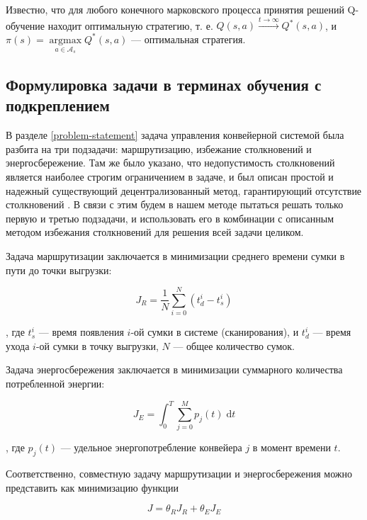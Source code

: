 \documentclass[specification,annotation,times]{itmo-student-thesis}
\DeclareMathOperator{\argmax}{argmax}
\theoremstyle{definition}
\begin{document}
Известно, что для любого конечного марковского процесса принятия решений
Q-обучение находит оптимальную стратегию, т. е. $Q(s, a) \xrightarrow{t
  \rightarrow \infty} Q^*(s, a)$, и $\pi(s) = \argmax\limits_{a \in
  \mathcal{A}_s} {Q^*(s, a)}$ --- оптимальная стратегия.

\subsection{Формулировка задачи в терминах обучения с подкреплением}\label{rl-task-formulation}

В разделе \ref{problem-statement} задача управления конвейерной системой была
разбита на три подзадачи: маршрутизацию, избежание столкновений и
энергосбережение. Там же было указано, что недопустимость столкновений является
наиболее строгим ограничением в задаче, и был описан простой и надежный
существующий децентрализованный метод, гарантирующий отсутствие столкновений
\cite{black2009intelligent}. В связи с этим будем в нашем методе пытаться решать
только первую и третью подзадачи, и использовать его в комбинации с описанным
методом избежания столкновений для решения всей задачи целиком.

Задача маршрутизации заключается в минимизации среднего времени сумки в пути до
точки выгрузки:

\begin{equation}\label{eqs:J_r}
  J_R = \frac{1}{N} \sum\limits_{i=0}^{N} (t_d^i - t_s^i)
\end{equation}

, где $t_s^i$ --- время появления $i$-ой сумки в системе (сканирования), и
$t_d^i$ --- время ухода $i$-ой сумки в точку выгрузки, $N$ --- общее количество
сумок.

Задача энергосбережения заключается в минимизации суммарного количества
потребленной энергии:

\begin{equation}\label{eqs:J_e}
  J_E = \int_0^T \! \sum\limits_{j=0}^{M} p_j(t) \; \mathrm{d}t
\end{equation}

, где $p_j(t)$ --- удельное энергопотребление конвейера $j$ в момент времени $t$.

Соответственно, совместную задачу маршрутизации и энергосбережения можно
представить как минимизацию функции 

\begin{equation}
  J = \theta_R J_R + \theta_E J_E
\end{equation}
\end{document}
